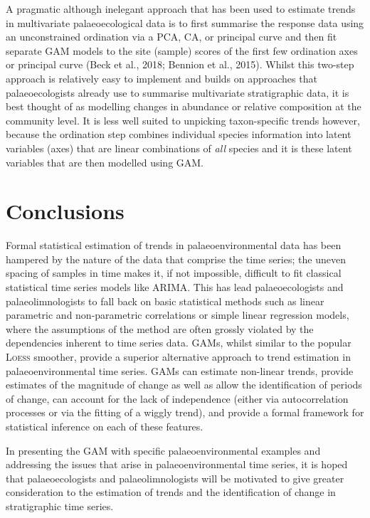 \documentclass[12pt,]{article}
\newcommand{\loess}{\textsc{Loess}}
\begin{document}
A pragmatic although inelegant approach that has been used to estimate
trends in multivariate palaeoecological data is to first summarise the
response data using an unconstrained ordination via a PCA, CA, or
principal curve and then fit separate GAM models to the site (sample)
scores of the first few ordination axes or principal curve (Beck et al.,
2018; Bennion et al., 2015). Whilst this two-step approach is relatively
easy to implement and builds on approaches that palaeoecologists already
use to summarise multivariate stratigraphic data, it is best thought of
as modelling changes in abundance or relative composition at the
community level. It is less well suited to unpicking taxon-specific
trends however, because the ordination step combines individual species
information into latent variables (axes) that are linear combinations of
\emph{all} species and it is these latent variables that are then
modelled using GAM.

\section{Conclusions}\label{conclusions}

Formal statistical estimation of trends in palaeoenvironmental data has
been hampered by the nature of the data that comprise the time series;
the uneven spacing of samples in time makes it, if not impossible,
difficult to fit classical statistical time series models like ARIMA.
This has lead palaeoecologists and palaeolimnologists to fall back on
basic statistical methods such as linear parametric and non-parametric
correlations or simple linear regression models, where the assumptions
of the method are often grossly violated by the dependencies inherent to
time series data. GAMs, whilst similar to the popular \loess{} smoother,
provide a superior alternative approach to trend estimation in
palaeoenvironmental time series. GAMs can estimate non-linear trends,
provide estimates of the magnitude of change as well as allow the
identification of periods of change, can account for the lack of
independence (either via autocorrelation processes or via the fitting of
a wiggly trend), and provide a formal framework for statistical
inference on each of these features.

In presenting the GAM with specific palaeoenvironmental examples and
addressing the issues that arise in palaeoenvironmental time series, it
is hoped that palaeoecologists and palaeolimnologists will be motivated
to give greater consideration to the estimation of trends and the
identification of change in stratigraphic time series.
\end{document}
